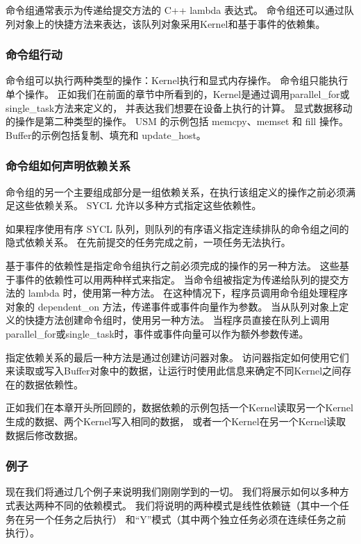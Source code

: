 命令组通常表示为传递给提交方法的 C++ lambda 表达式。 
命令组还可以通过队列对象上的快捷方法来表达，该队列对象采用Kernel和基于事件的依赖集。

\subsubsection{命令组行动}
命令组可以执行两种类型的操作：Kernel执行和显式内存操作。 命令组只能执行单个操作。 
正如我们在前面的章节中所看到的，Kernel是通过调用parallel\_for或single\_task方法来定义的，
并表达我们想要在设备上执行的计算。 显式数据移动的操作是第二种类型的操作。 
USM 的示例包括 memcpy、memset 和 fill 操作。 Buffer的示例包括复制、填充和 update\_host。

\subsubsection{命令组如何声明依赖关系}
命令组的另一个主要组成部分是一组依赖关系，在执行该组定义的操作之前必须满足这些依赖关系。 
SYCL 允许以多种方式指定这些依赖性。

如果程序使用有序 SYCL 队列，则队列的有序语义指定连续排队的命令组之间的隐式依赖关系。 
在先前提交的任务完成之前，一项任务无法执行。

基于事件的依赖性是指定命令组执行之前必须完成的操作的另一种方法。 这些基于事件的依赖性可以用两种样式来指定。 
当命令组被指定为传递给队列的提交方法的 lambda 时，使用第一种方法。 
在这种情况下，程序员调用命令组处理程序对象的 dependent\_on 方法，传递事件或事件向量作为参数。 
当从队列对象上定义的快捷方法创建命令组时，使用另一种方法。 
当程序员直接在队列上调用parallel\_for或single\_task时，事件或事件向量可以作为额外参数传递。

指定依赖关系的最后一种方法是通过创建访问器对象。 
访问器指定如何使用它们来读取或写入Buffer对象中的数据，让运行时使用此信息来确定不同Kernel之间存在的数据依赖性。

正如我们在本章开头所回顾的，数据依赖的示例包括一个Kernel读取另一个Kernel生成的数据、两个Kernel写入相同的数据，
或者一个Kernel在另一个Kernel读取数据后修改数据。

\subsubsection{例子}
现在我们将通过几个例子来说明我们刚刚学到的一切。 我们将展示如何以多种方式表达两种不同的依赖模式。 
我们将说明的两种模式是线性依赖链（其中一个任务在另一个任务之后执行）
和“Y”模式（其中两个独立任务必须在连续任务之前执行）。

